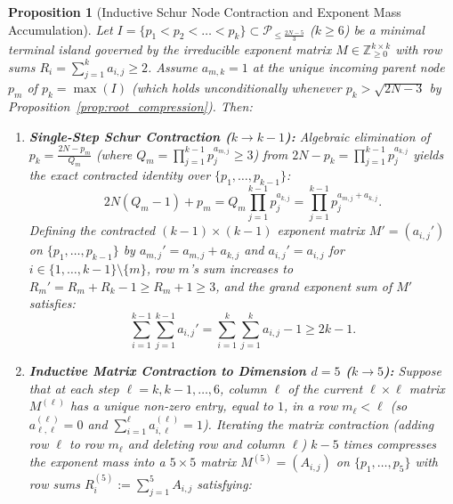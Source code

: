 \documentclass[11pt,a4paper]{article}
\newtheorem{proposition}[theorem]{Proposition}
\theoremstyle{definition}
\begin{document}
\begin{proposition}[Inductive Schur Node Contraction and Exponent Mass Accumulation]
\label{prop:inductive_contraction}
Let $I = \{p_1 < p_2 < \dots < p_k\} \subset \mathcal{P}_{\le \frac{2N-5}{3}}$ ($k \ge 6$) be a minimal terminal island governed by the irreducible exponent matrix $M \in \mathbb{Z}_{\ge 0}^{k \times k}$ with row sums $R_i = \sum_{j=1}^k a_{i,j} \ge 2$. Assume $a_{m,k} = 1$ at the unique incoming parent node $p_m$ of $p_k = \max(I)$ (which holds unconditionally whenever $p_k > \sqrt{2N - 3}$ by Proposition~\ref{prop:root_compression}). Then:
\begin{enumerate}
    \item \textbf{Single-Step Schur Contraction ($k \to k-1$):} Algebraic elimination of $p_k = \frac{2N - p_m}{Q_m}$ (where $Q_m = \prod_{j=1}^{k-1} p_j^{a_{m,j}} \ge 3$) from $2N - p_k = \prod_{j=1}^{k-1} p_j^{a_{k,j}}$ yields the exact contracted identity over $\{p_1, \dots, p_{k-1}\}$:
    \begin{equation}
    \label{eq:schur_contract_id}
    2N(Q_m - 1) + p_m = Q_m \prod_{j=1}^{k-1} p_j^{a_{k,j}} = \prod_{j=1}^{k-1} p_j^{a_{m,j} + a_{k,j}}.
    \end{equation}
    Defining the contracted $(k-1) \times (k-1)$ exponent matrix $M' = (a_{i,j}')$ on $\{p_1, \dots, p_{k-1}\}$ by $a_{m,j}' = a_{m,j} + a_{k,j}$ and $a_{i,j}' = a_{i,j}$ for $i \in \{1, \dots, k-1\} \setminus \{m\}$, row $m$'s sum increases to $R_m' = R_m + R_k - 1 \ge R_m + 1 \ge 3$, and the grand exponent sum of $M'$ satisfies:
    \begin{equation}
    \label{eq:grand_sum_conservation}
    \sum_{i=1}^{k-1} \sum_{j=1}^{k-1} a_{i,j}' = \sum_{i=1}^k \sum_{j=1}^k a_{i,j} - 1 \ge 2k - 1.
    \end{equation}
    \item \textbf{Inductive Matrix Contraction to Dimension $d = 5$ ($k \to 5$):} Suppose that at each step $\ell = k, k-1, \dots, 6$, column $\ell$ of the current $\ell \times \ell$ matrix $M^{(\ell)}$ has a unique non-zero entry, equal to $1$, in a row $m_\ell < \ell$ (so $a^{(\ell)}_{\ell,\ell} = 0$ and $\sum_{i=1}^\ell a^{(\ell)}_{i,\ell} = 1$). Iterating the matrix contraction (adding row $\ell$ to row $m_\ell$ and deleting row and column $\ell$) $k - 5$ times compresses the exponent mass into a $5 \times 5$ matrix $M^{(5)} = (A_{i,j})$ on $\{p_1, \dots, p_5\}$ with row sums $R_i^{(5)} := \sum_{j=1}^5 A_{i,j}$ satisfying:
    \begin{equation}
    \label{eq:grand_sum_5x5}

\end{equation}
\end{enumerate}
\end{proposition}
\end{document}
